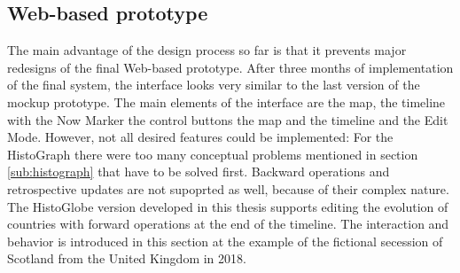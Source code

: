 
\subsection{Web-based prototype} %
\label{sub:web_based_prototype}

The main advantage of the design process so far is that it prevents major redesigns of the final Web-based prototype. After three months of implementation of the final system, the interface looks very similar to the last version of the mockup prototype. The main elements of the interface are the map, the timeline with the Now Marker the control buttons the map and the timeline and the Edit Mode. However, not all desired features could be implemented: For the HistoGraph there were too many conceptual problems mentioned in section \ref{sub:histograph} that have to be solved first. Backward operations and retrospective updates are not supoprted as well, because of their complex nature. The HistoGlobe version developed in this thesis supports editing the evolution of countries with forward operations at the end of the timeline. The interaction and behavior is introduced in this section at the example of the fictional secession of Scotland from the United Kingdom in 2018.

